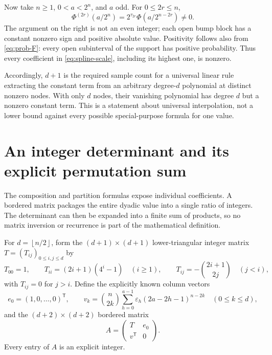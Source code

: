 \documentclass[11pt,a4paper]{article}
\theoremstyle{definition}
\theoremstyle{remark}
\newcommand{\eps}{\varepsilon}
\newcommand{\floor}[1]{\left\lfloor #1\right\rfloor}
\begin{document}
Now take \(n\geq1\), \(0<a<2^n\), and \(a\) odd.  For \(0\leq2r\leq n\),
\[
 \Phi^{(2r)}(a/2^n)=2^{\tau_{2r}}\Phi(a/2^{n-2r})\ne0.
\]
The argument on the right is not an even integer; each open bump block has a
constant nonzero sign and positive absolute value.  Positivity follows also from
\eqref{eq:prob-F}: every open subinterval of the support has positive probability.
Thus every coefficient in \eqref{eq:spline-scale}, including its highest one, is
nonzero.

Accordingly, \(d+1\) is the required sample count for a universal linear rule
extracting the constant term from an arbitrary degree-\(d\) polynomial at distinct
nonzero nodes.  With only \(d\) nodes, their vanishing polynomial has degree \(d\)
but a nonzero constant term.  This is a statement about universal interpolation,
not a lower bound against every possible special-purpose formula for one value.

\section{An integer determinant and its explicit permutation sum}
\label{sec:determinant}
The composition and partition formulas expose individual coefficients.  A bordered
matrix packages the entire dyadic value into a single ratio of integers.
The determinant can then be expanded into a finite sum of products, so no matrix
inversion or recurrence is part of the mathematical definition.

For \(d=\floor{n/2}\), form the \((d+1)\times(d+1)\) lower-triangular integer
matrix \(T=(T_{ij})_{0\leq i,j\leq d}\) by
\begin{equation}
 T_{00}=1,\qquad
 T_{ii}=(2i+1)(4^i-1)\quad(i\geq1),\qquad
 T_{ij}=-\binom{2i+1}{2j}\quad(j<i),                    \label{eq:T}
\end{equation}
with \(T_{ij}=0\) for \(j>i\).  Define the explicitly known column vectors
\begin{equation}
 e_0=(1,0,\ldots,0)^{\mathsf T},\qquad
 v_k=\binom n{2k}\sum_{h=0}^{a-1}\eps_h
                       (2a-2h-1)^{n-2k}\quad(0\leq k\leq d),
                                                               \label{eq:det-v}
\end{equation}
and the \((d+2)\times(d+2)\) bordered matrix
\begin{equation}
 A=\begin{pmatrix}T&e_0\\v^{\mathsf T}&0\end{pmatrix}.
                                                               \label{eq:border}
\end{equation}
Every entry of \(A\) is an explicit integer.
\end{document}
